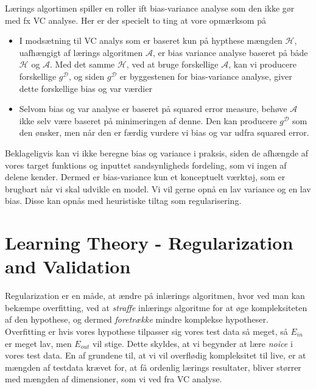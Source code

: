 \documentclass[paper=a4, fontsize=11pt]{scrartcl} %
\numberwithin{equation}{section} %
\numberwithin{figure}{section} %
\numberwithin{table}{section} %
\begin{document}
	Lærings algortimen spiller en roller ift bias-variance analyse som den ikke gør med fx VC analyse. Her er der specielt to ting at vore opmærksom på 
	\begin{itemize}
		\item I modsætning til VC analys som er baseret kun på hypthese mængden $\mathcal{H}$, uafhængigt af lærings algoritmen $\mathcal{A}$, er bias variance analyse baseret på både $\mathcal{H}$ og $\mathcal{A}$. Med det samme $\mathcal{H}$, ved at bruge forskellige $\mathcal{A}$, kan vi producere forskellige $g^\mathcal{D}$, og siden $g^\mathcal{D}$ er byggestenen for bias-variance analyse, giver dette forskellige bias og var værdier
		\item Selvom bias og var analyse er baseret på squared error measure, behøve $\mathcal{A}$ ikke selv være baseret på minimeringen af denne. Den kan producere $g^\mathcal{D}$ som den ønsker, men når den er færdig vurdere vi bias og var udfra squared error.
	\end{itemize}
	Beklageligvis kan vi ikke beregne bias og variance i praksis, siden de afhængde af vores target funktions og inputtet sandsynligheds fordeling, som vi ingen af delene kender. Dermed er bias-variance kun et konceptuelt værktøj, som er brugbart når vi skal udvikle en model. Vi vil gerne opnå en lav variance og en lav bias. Disse kan opnås med heuristiske tiltag som regularisering. 
	
	\newpage
	
	\section*{Learning Theory - Regularization and Validation}
	
	Regularization er en måde, at ændre på inlærings algoritmen, hvor ved man kan bekæmpe overfitting, ved at \textit{straffe} inlærings algoritme for at øge kompleksiteten af den hypothese, og dermed \textit{foretrække} mindre komplekse hypotheser.\\
	
	 Overfitting er hvis vores hypothese tilpasser sig vores test data så meget, så $E_{in}$ er meget lav, men $E_{out}$ vil stige. Dette skyldes, at vi begynder at lære \textit{noice} i vores test data. En af grundene til, at vi vil overflødig kompleksitet til live, er at mængden af testdata krævet for, at få ordenlig lærings resultater, bliver størrer med mængden af dimensioner, som vi ved fra VC analyse. \\
	 
\end{document}
